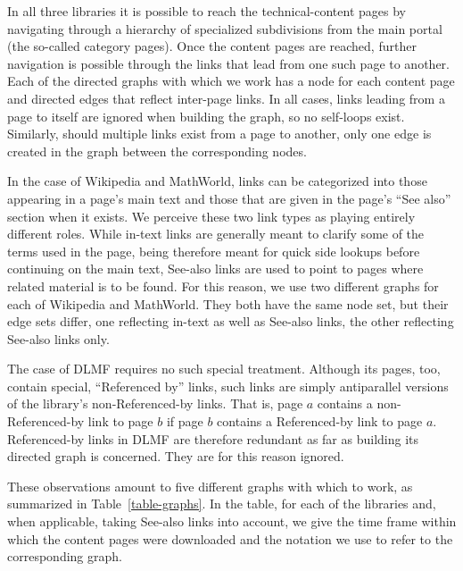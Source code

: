 \documentclass{article}
\begin{document}
In all three libraries it is possible to reach the technical-content pages by
navigating through a hierarchy of specialized subdivisions from the main portal
(the so-called category pages). Once the content pages are reached, further
navigation is possible through the links that lead from one such page to
another. Each of the directed graphs with which we work has a node for each
content page and directed edges that reflect inter-page links. In all cases,
links leading from a page to itself are ignored when building the graph, so no
self-loops exist. Similarly, should multiple links exist from a page to another,
only one edge is created in the graph between the corresponding nodes.

In the case of Wikipedia and MathWorld, links can be categorized into those
appearing in a page's main text and those that are given in the page's ``See
also'' section when it exists. We perceive these two link types as playing
entirely different roles. While in-text links are generally meant to clarify
some of the terms used in the page, being therefore meant for quick side lookups
before continuing on the main text, See-also links are used to point to pages
where related material is to be found. For this reason, we use two different
graphs for each of Wikipedia and MathWorld. They both have the same node set,
but their edge sets differ, one reflecting in-text as well as See-also links,
the other reflecting See-also links only.

The case of DLMF requires no such special treatment. Although its pages, too,
contain special, ``Referenced by'' links, such links are simply antiparallel
versions of the library's non-Referenced-by links. That is, page $a$ contains a
non-Referenced-by link to page $b$ if page $b$ contains a Referenced-by link to
page $a$. Referenced-by links in DLMF are therefore redundant as far as building
its directed graph is concerned. They are for this reason ignored.

These observations amount to five different graphs with which to work, as
summarized in Table~\ref{table-graphs}. In the table, for each of the libraries
and, when applicable, taking See-also links into account, we give the time frame
within which the content pages were downloaded and the notation we use to refer
to the corresponding graph.

\begin{table}
\centering
\caption{Online libraries and corresponding directed graphs.}
\label{table-graphs}

\end{table}
\end{document}
